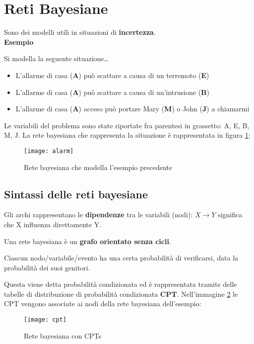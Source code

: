 \newpage

\section{Reti Bayesiane}

Sono dei modelli utili in situazioni di \textbf{incertezza}.\\

\textbf{Esempio}

Si modella la seguente situazione\dots

\begin{itemize}
\item L'allarme di casa (\textbf{A}) può scattare a causa di un terremoto
(\textbf{E})
\item L'allarme di casa (\textbf{A}) può scattare a causa di un'intrusione
(\textbf{B})
\item L'allarme di casa (\textbf{A}) acceso può portare Mary (\textbf{M}) o
John (\textbf{J}) a chiamarmi
\end{itemize}

Le variabili del problema sono state riportate fra parentesi in grassetto:
A, E, B, M, J.
La rete bayesiana che rappresenta la situazione è rappresentata in figura
\ref{fig:alarm}:

\begin{figure}[H]
\centering
\texttt{[image: alarm]}
\caption{Rete bayesiana che modella l'esempio precedente}
\label{fig:alarm}
\end{figure}

\subsection{Sintassi delle reti bayesiane}

Gli archi rappresentano le \textbf{dipendenze} tra le variabili (nodi):
$X \rightarrow Y$ significa che X influenza direttamente Y.

Una rete bayesiana è un \textbf{grafo orientato senza cicli}.

Ciascun nodo/variabile/evento ha una certa probabilità di verificarsi,
data la probabilità dei suoi genitori.

Questa viene detta probabilità condizionata ed è rappresentata tramite
delle tabelle di distribuzione di probabilità condizionata \textbf{CPT}.
Nell'immagine \ref{fig:cpt} le CPT vengono associate ai nodi della rete
bayesiana dell'esempio:

\begin{figure}[H]
\centering
\texttt{[image: cpt]}
\caption{Rete bayesiana con CPTs}
\label{fig:cpt}
\end{figure}

